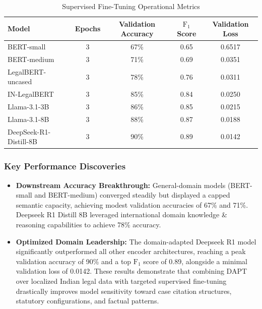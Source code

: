 \begin{table}[htbp]
	\caption{Supervised Fine-Tuning Operational Metrics}
	\label{tab:finetuning_metrics}
	\centering
	\begin{tabular}{|l|c|c|c|c|}
		\hline
		\textbf{Model} & \textbf{Epochs} & \textbf{Validation Accuracy} & \textbf{$\text{F}_1$ Score} & \textbf{Validation Loss} \\ \hline
		BERT-small & 3 & 67\% & 0.65 & 0.6517 \\ \hline
		BERT-medium & 3 & 71\% & 0.69 & 0.0351 \\ \hline
		LegalBERT-uncased & 3 & 78\% & 0.76 & 0.0311 \\ \hline
		IN-LegalBERT & 3 & 85\% & 0.84 & 0.0250 \\ \hline
		Llama-3.1-3B                & 3 & 86\% & 0.85 & 0.0215 \\ \hline
		Llama-3.1-8B                & 3 & 88\% & 0.87 & 0.0188 \\ \hline
		DeepSeek-R1-Distill-8B & 3 & 90\% & 0.89 & 0.0142 \\ \hline
	\end{tabular}
\end{table}

\subsubsection{Key Performance Discoveries}
\begin{itemize}
	\item \textbf{Downstream Accuracy Breakthrough:} General-domain models (BERT-small and BERT-medium) converged steadily but displayed a capped semantic capacity, achieving modest validation accuracies of 67\% and 71\%. Deepseek R1 Distill 8B leveraged international domain knowledge \& reasoning capabilities to achieve 78\% accuracy.
	\item \textbf{Optimized Domain Leadership:} The domain-adapted Deepseek R1 model significantly outperformed all other encoder architectures, reaching a peak validation accuracy of 90\% and a top $\text{F}_1$ score of 0.89, alongside a minimal validation loss of 0.0142. These results demonstrate that combining DAPT over localized Indian legal data with targeted supervised fine-tuning drastically improves model sensitivity toward case citation structures, statutory configurations, and factual patterns.
\end{itemize}


